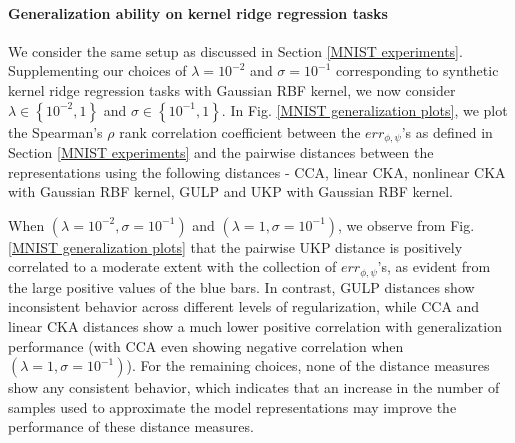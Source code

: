 \documentclass[11pt]{article}
\newcommand{\repone}{\phi}
\newcommand{\reptwo}{\psi}
\newcommand{\metricstname}{UKP }
\theoremstyle{plain}
\begin{document}
\raggedbottom


\paragraph{Generalization ability on kernel ridge regression tasks}

We consider the same setup as discussed in Section \ref{MNIST experiments}. Supplementing our choices of $\lambda=10^{-2}$ and $\sigma=10^{-1}$ corresponding to synthetic kernel ridge regression tasks with Gaussian RBF kernel, we now consider $\lambda \in \left\{10^{-2},1\right\}$  and $\sigma \in \left\{10^{-1},1\right\}$. In Fig. \ref{MNIST generalization plots}, we plot the Spearman's $\rho$ rank correlation coefficient between the $err_{\repone,\reptwo}$'s as defined in Section \ref{MNIST experiments} and the pairwise distances between the representations using the following distances - CCA, linear CKA, nonlinear CKA with Gaussian RBF kernel, GULP and UKP with Gaussian RBF kernel. 

When $(\lambda = 10^{-2},\sigma = 10^{-1})$ and $(\lambda=1,\sigma=10^{-1})$, we observe from Fig. \ref{MNIST generalization plots} that the pairwise \metricstname distance is positively correlated to a moderate extent with the collection of $err_{\repone,\reptwo}$'s, as evident from the large positive values of the blue bars. In contrast, GULP distances show inconsistent behavior across different levels of regularization, while CCA and linear CKA distances show a much lower positive correlation with generalization performance (with CCA even showing negative correlation when $(\lambda=1,\sigma=10^{-1})$). For the remaining choices, none of the distance measures show any consistent behavior, which indicates that an increase in the number of samples used to approximate the model representations may improve the performance of these distance measures.

\raggedbottom
\end{document}
